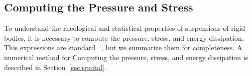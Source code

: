\documentclass[preprint, 10pt]{elsarticle}
\begin{document}
%
%

\subsection{Computing the Pressure and Stress}
To understand the rheological and statistical properties of suspensions
of rigid bodies, it is necessary to compute the pressure, stress, and
energy dissipation.  This expressions are standard~\cite{}
, but we summarize
them for completeness.  A numerical method for Computing the pressure,
stress, and energy dissipation is described in
Section~\ref{sec:spatial}.
\end{document}
